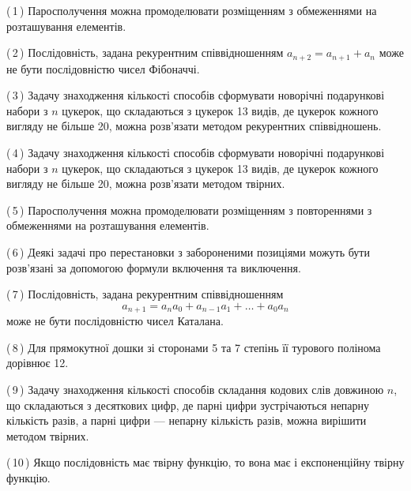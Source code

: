 \documentclass[12pt, ukrainian]{article}
\begin{document}
\begin {large}
\begin {large}
\begin {large}
\begin {large}
\begin {large}
\begin {large}
\begin {large}
\begin {large}
\begin {large}
\begin {large}
\begin {large}
\begin {large}
\begin {large}
\begin {large}
\begin {large}
\begin {large}
\begin {large}
\begin {large}
\begin {large}
\begin {large}
{\vspace{2mm}

(\,1\,) Паросполучення можна промоделювати розміщенням з обмеженнями на розташування елементів.%



(\,2\,) Послідовність, задана рекурентним співвідношенням $a_{n+2}=a_{n+1}+a_{n}$ може не бути послідовністю чисел Фібоначчі.%



(\,3\,) Задачу знаходження кількості способів сформувати новорічні подарункові набори з $n$ цукерок, що складаються з цукерок 13 видів, де цукерок кожного вигляду не більше 20, можна розв’язати методом рекурентних співвідношень.%



(\,4\,) Задачу знаходження кількості способів сформувати новорічні подарункові набори з $n$ цукерок, що складаються з цукерок 13 видів, де цукерок кожного вигляду не більше 20, можна розв’язати методом твірних.%



(\,5\,) Паросполучення можна промоделювати розміщенням з повтореннями з обмеженнями на розташування елементів.%



(\,6\,) Деякі задачі про перестановки з забороненими позиціями можуть бути розв’я\-за\-ні за допомогою формули включення та виключення.%



(\,7\,) Послідовність, задана рекурентним співвідношенням $$a_{n+1}=a_{n}a_{0}+a_{n-1}a_{1}+\ldots+a_0a_{n}$$ може не бути послідовністю чисел Каталана.%



(\,8\,) Для прямокутної дошки зі сторонами 5 та 7 степінь її турового полінома дорівнює 12.%



(\,9\,) Задачу знаходження кількості способів складання кодових слів довжиною $n$, що складаються з десяткових цифр, де парні цифри зустрічаються непарну кількість разів, а парні цифри — непарну кількість разів, можна вирішити методом твірних.%



(\,10\,) Якщо послідовність має твірну функцію, то вона має і експоненційну твірну функцію.%




\vspace{5mm}
}
\newpage

\begin {large}


\end{large}
\end{large}
\end{large}
\end{large}
\end{large}
\end{large}
\end{large}
\end{large}
\end{large}
\end{large}
\end{large}
\end{large}
\end{large}
\end{large}
\end{large}
\end{large}
\end{large}
\end{large}
\end{large}
\end{large}
\end{large}
\end{document}
